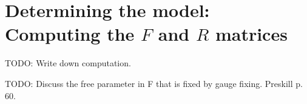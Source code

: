 \documentclass[a4paper,10pt,oneside]{book}
\theoremstyle{plain}
\theoremstyle{definition}
\theoremstyle{remark}
\begin{document}
\section{Determining the model: Computing the $F$ and $R$ matrices}

TODO: Write down computation.

TODO: Discuss the free parameter in F that is fixed by gauge fixing. Preskill p. 60.

\end{document}
